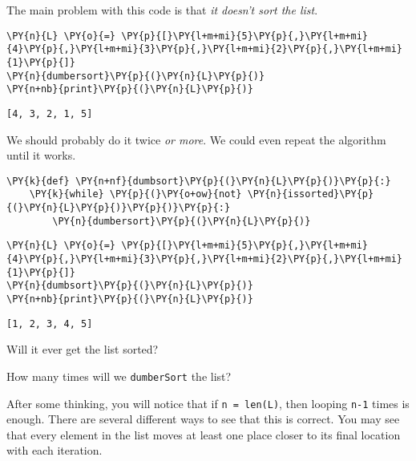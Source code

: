The main problem with this code is that \emph{it doesn't sort the list}.


\begin{Verbatim}[commandchars=\\\{\}]
\PY{n}{L} \PY{o}{=} \PY{p}{[}\PY{l+m+mi}{5}\PY{p}{,}\PY{l+m+mi}{4}\PY{p}{,}\PY{l+m+mi}{3}\PY{p}{,}\PY{l+m+mi}{2}\PY{p}{,}\PY{l+m+mi}{1}\PY{p}{]}
\PY{n}{dumbersort}\PY{p}{(}\PY{n}{L}\PY{p}{)}
\PY{n+nb}{print}\PY{p}{(}\PY{n}{L}\PY{p}{)}
\end{Verbatim}

\begin{Verbatim}
[4, 3, 2, 1, 5]

\end{Verbatim}


We should probably do it twice \emph{or more}.  We could even repeat the algorithm until it works.

\begin{Verbatim}[commandchars=\\\{\}]
\PY{k}{def} \PY{n+nf}{dumbsort}\PY{p}{(}\PY{n}{L}\PY{p}{)}\PY{p}{:}
    \PY{k}{while} \PY{p}{(}\PY{o+ow}{not} \PY{n}{issorted}\PY{p}{(}\PY{n}{L}\PY{p}{)}\PY{p}{)}\PY{p}{:}
        \PY{n}{dumbersort}\PY{p}{(}\PY{n}{L}\PY{p}{)}
\end{Verbatim}



\begin{Verbatim}[commandchars=\\\{\}]
\PY{n}{L} \PY{o}{=} \PY{p}{[}\PY{l+m+mi}{5}\PY{p}{,}\PY{l+m+mi}{4}\PY{p}{,}\PY{l+m+mi}{3}\PY{p}{,}\PY{l+m+mi}{2}\PY{p}{,}\PY{l+m+mi}{1}\PY{p}{]}
\PY{n}{dumbsort}\PY{p}{(}\PY{n}{L}\PY{p}{)}
\PY{n+nb}{print}\PY{p}{(}\PY{n}{L}\PY{p}{)}
\end{Verbatim}

\begin{Verbatim}
[1, 2, 3, 4, 5]

\end{Verbatim}


Will it ever get the list sorted?  


How many times will we \texttt{dumberSort} the list?


After some thinking, you will notice that if \texttt{n = len(L)}, then looping \texttt{n-1} times is enough.  There are several different ways to see that this is correct.  You may see that every element in the list moves at least one place closer to its final location with each iteration.  



